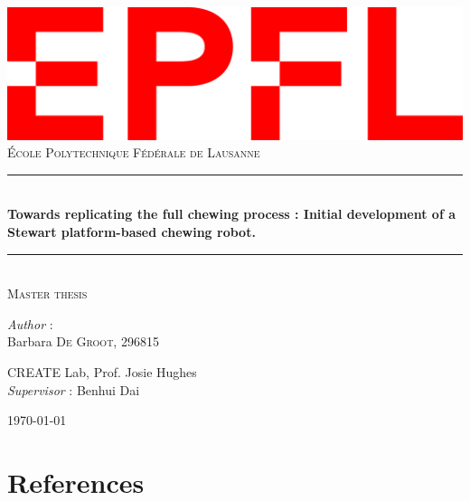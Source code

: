 \documentclass[11pt,a4paper]{article}
\begin{document}
    \begin{titlepage}
    \newcommand{\HRule}{\rule{\linewidth}{0.2mm}}
    \center
    \includegraphics[scale=0.25]{figures/logo.png}\\[0.4cm]

    \textsc{\Large École Polytechnique Fédérale de Lausanne}\\[1.5cm]
    \vfill
    
    \HRule \\[0.4cm]
    {\LARGE \bfseries Towards replicating the full chewing process : Initial development of a Stewart platform-based chewing robot.}\\
    \HRule \\ [0.5cm]
    
    \textsc{\Large Master thesis}
    \vfill 
   
    \centering
    \bigskip
    \textit{Author} : \\[0.2cm]

    Barbara \textsc{De Groot, 296815}\\

    \bigskip
    \bigskip

    CREATE Lab, Prof. Josie Hughes\\
    \textit{Supervisor} : Benhui Dai\\[0.2cm]

    \bigskip
    \bigskip
    
    {\large \today}\\[2cm]
    \end{titlepage}

\newpage
\tableofcontents

\newpage
%

\newpage





\newpage
\section{References}
\printbibliography[heading=none]


\end{document}
